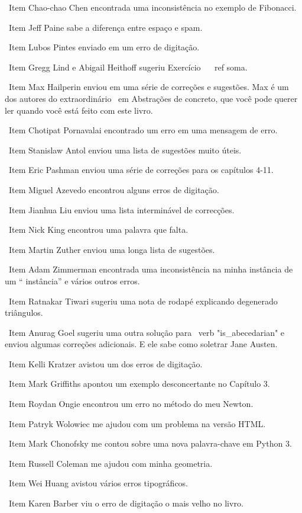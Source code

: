 \documentclass[10pt]{book}
\begin{document}
\begin {itemize}
\ Item Chao-chao Chen encontrada uma inconsistência no exemplo de Fibonacci.

\ Item Jeff Paine sabe a diferença entre espaço e spam.

\ Item Lubos Pintes enviado em um erro de digitação.

\ Item Gregg Lind e Abigail Heithoff sugeriu Exercício ~ \ ref {soma}.

\ Item Max Hailperin enviou em uma série de correções e
  sugestões. Max é um dos autores do extraordinário {\ em
    Abstrações de concreto}, que você pode querer ler quando você está
  feito com este livro.

\ Item Chotipat Pornavalai encontrado um erro em uma mensagem de erro.

\ Item Stanislaw Antol enviou uma lista de sugestões muito úteis.

\ Item Eric Pashman enviou uma série de correções para os capítulos 4-11.

\ Item Miguel Azevedo encontrou alguns erros de digitação.

\ Item Jianhua Liu enviou uma lista interminável de correcções.

\ Item Nick King encontrou uma palavra que falta.

\ Item Martin Zuther enviou uma longa lista de sugestões.

\ Item Adam Zimmerman encontrada uma inconsistência na minha instância
de um `` instância'' e vários outros erros.

\ Item Ratnakar Tiwari sugeriu uma nota de rodapé explicando degenerado
triângulos.

\ Item Anurag Goel sugeriu uma outra solução para \ verb "is_abecedarian"
e enviou algumas correções adicionais. E ele sabe como
soletrar Jane Austen.

\ Item Kelli Kratzer avistou um dos erros de digitação.

\ Item Mark Griffiths apontou um exemplo desconcertante no Capítulo 3.

\ Item Roydan Ongie encontrou um erro no método do meu Newton.

\ Item Patryk Wolowiec me ajudou com um problema na versão HTML.

\ Item Mark Chonofsky me contou sobre uma nova palavra-chave em Python 3.

\ Item Russell Coleman me ajudou com minha geometria.

\ Item Wei Huang avistou vários erros tipográficos.

\ Item Karen Barber viu o erro de digitação o mais velho no livro.


\end{itemize}
\end{document}
